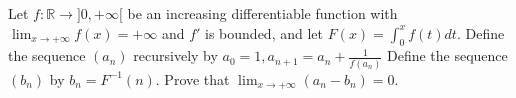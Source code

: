 Let \(f\colon  \mathbb{R}\to ]0,+\infty[\) be an increasing differentiable function with \(\lim_{x\rightarrow+\infty}f(x)=+\infty\) and \(f'\) is bounded, and let \(F(x)=\int^x_0 f(t) dt\).
Define the sequence \((a_n)\) recursively by \(a_0=1,a_{n+1}=a_n+\frac1{f(a_n)}\)
Define the sequence \((b_n)\) by \(b_n=F^{-1}(n)\).
Prove that \(\lim_{x\rightarrow+\infty}(a_n-b_n)=0\).